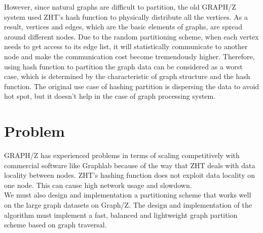 \documentclass[10pt]{article}
\begin{document}
\begin{multicols}{2}
  However, since natural graphs are difficult to partition, the old GRAPH/Z system used ZHT’s hash function to physically distribute all the vertices. As a result, vertices and edges, which are the basic elements of graphs, are spread around different nodes. Due to the random partitioning scheme, when each vertex needs to get access to its edge list, it will statistically communicate to another node and make the communication cost become tremendously higher. Therefore, using hash function to partition the graph data can be considered as a worst case, which is determined by the characteristic of graph structure and the hash function. The original use case of hashing partition is dispersing the data to avoid hot spot, but it doesn’t help in the case of graph processing system.
  
  \section{Problem}
  GRAPH/Z has experienced problems in terms of scaling competitively with commercial software like Graphlab because of the way that ZHT deals with data locality between nodes. ZHT's hashing function does not exploit data locality on one node.\cite{Gz:3} This can cause high network usage and slowdown.\\
  We must also design and implementation a partitioning scheme that works well on the large graph datasets on Graph/Z. The design and implementation of the algorithm must implement a fast, balanced and lightweight graph partition scheme based on graph traversal.

\end{multicols}
\end{document}
